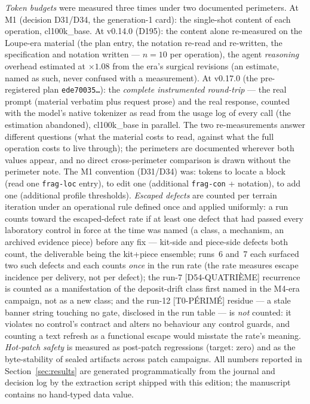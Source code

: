 \documentclass[11pt,a4paper]{article}
\newcommand{\code}[1]{\texttt{\small #1}}
\begin{document}
\emph{Token budgets} were measured three times under two documented
perimeters. At M1 (decision D31/D34, the generation-1 card): the
single-shot content of each operation, cl100k\_base. At v0.14.0 (D195):
the content alone re-measured on the Loupe-era material (the plan entry,
the notation re-read and re-written, the specification and notation
written --- $n{=}10$ per operation), the agent \emph{reasoning} overhead
estimated at $\times 1.08$ from the era's surgical revisions (an
estimate, named as such, never confused with a measurement). At v0.17.0
(the pre-registered plan \code{ede70035\ldots}): the \emph{complete
instrumented round-trip} --- the real prompt (material verbatim plus
request prose) and the real response, counted with the model's native
tokenizer as read from the usage log of every call (the estimation
abandoned), cl100k\_base in parallel. The two re-measurements answer
different questions (what the material costs to read, against what the
full operation costs to live through); the perimeters are documented
wherever both values appear, and no direct cross-perimeter comparison
is drawn without the perimeter note. The M1 convention (D31/D34) was:
tokens to locate a block (read one \code{frag-loc} entry), to edit one
(additional \code{frag-con} + notation), to add one (additional
profile thresholds). \emph{Escaped defects} are counted per terrain
iteration under an operational rule defined once and applied uniformly:
a run counts toward the escaped-defect rate if at least one defect that
had passed every laboratory control in force at the time was named (a
class, a mechanism, an archived evidence piece) before any fix ---
kit-side and piece-side defects both count, the deliverable being the
kit+piece ensemble; runs~6 and~7 each surfaced two such defects and each
counts \emph{once} in the run rate (the rate measures escape incidence
per delivery, not per defect); the run-7 [D54-QUATRI\`EME] recurrence
is counted as a manifestation of the deposit-drift class first named in
the M4-era campaign, not as a new class; and the run-12 [T0-P\'ERIM\'E]
residue --- a stale banner string touching no gate, disclosed in the run
table --- is \emph{not} counted: it violates no control's contract and
alters no behaviour any control guards, and counting a text refresh as a
functional escape would misstate the rate's meaning.
\emph{Hot-patch safety} is measured as post-patch regressions (target:
zero) and as the byte-stability of sealed artifacts across patch
campaigns. All numbers reported in Section~\ref{sec:results} are
generated programmatically from the journal and decision log by the
extraction script shipped with this edition; the manuscript contains no
hand-typed data value.
\end{document}
